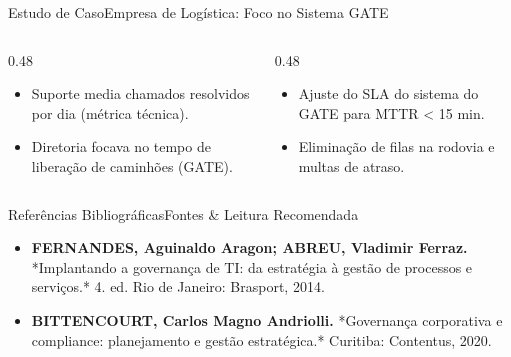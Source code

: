 \begin{senaiframe}{Estudo de Caso}{Empresa de Logística: Foco no Sistema GATE}
  \begin{columns}[t]
    \begin{column}{0.48\textwidth}
      \begin{tcolorbox}[senaibluecard, title={Situação Inicial}]
        \begin{itemize}
          \item Suporte media chamados resolvidos por dia (métrica técnica).
          \item Diretoria focava no tempo de liberação de caminhões (GATE).
        \end{itemize}
      \end{tcolorbox}
    \end{column}
    \begin{column}{0.48\textwidth}
      \begin{tcolorbox}[senaigreencard, title={Alinhamento por KPI}]
        \begin{itemize}
          \item Ajuste do SLA do sistema do GATE para MTTR < 15 min.
          \item Eliminação de filas na rodovia e multas de atraso.
        \end{itemize}
      \end{tcolorbox}
    \end{column}
  \end{columns}
\end{senaiframe}

\begin{senaiframe}{Referências Bibliográficas}{Fontes \& Leitura Recomendada}
  \vspace{0.5cm}
  \begin{tcolorbox}[senaicard, title={Obras de Referência}]
    \begin{itemize}
      \item \textbf{FERNANDES, Aguinaldo Aragon; ABREU, Vladimir Ferraz.} *Implantando a governança de TI: da estratégia à gestão de processos e serviços.* 4. ed. Rio de Janeiro: Brasport, 2014.
      \item \textbf{BITTENCOURT, Carlos Magno Andriolli.} *Governança corporativa e compliance: planejamento e gestão estratégica.* Curitiba: Contentus, 2020.
    \end{itemize}
  \end{tcolorbox}
\end{senaiframe}

